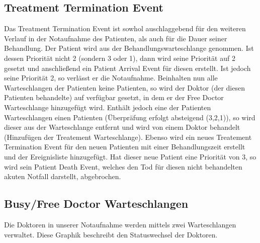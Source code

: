 \documentclass[12pt,fleqn,a4paper]{article}
\begin{document}
\subsection{Treatment Termination Event}
Das Treatment Termination Event ist sowhol auschlaggebend f\"{u}r den weiteren Verlauf in der Notaufnahme des Patienten, als auch f\"{u}r die Dauer seiner Behandlung. Der Patient wird aus der Behandlungswarteschlange genommen. Ist dessen Priorit\"{a}t nicht 2 (sondern 3 oder 1), dann wird seine Priorit\"{a}t auf 2 gesetzt und anschlie\ss end ein Patient Arrival Event f\"{u}r diesen erstellt. Ist jedoch seine Priorit\"{a}t 2, so verl\"{a}sst er die Notaufnahme.
Beinhalten nun alle Warteschlangen der Patienten keine Patienten, so wird der Doktor (der diesen Patienten behandelte) auf verf\"{u}gbar gesetzt, in dem er der Free Doctor Warteschlange hinzugef\"{u}gt wird. Enth\"{a}lt jedoch eine der Patienten Warteschlangen einen Patienten (\"{U}berpr\"{a}fung erfolgt absteigend (3,2,1)),  so wird dieser aus der Warteschlange entfernt und wird von einem Doktor behandelt (Hinzuf\"{u}gen der Treatement Warteschlange). Ebenso wird ein neues Treatement Termination Event f\"{u}r den neuen Patienten mit einer Behandlungszeit erstellt und der Ereignisliste hinzugef\"{u}gt.
Hat dieser neue Patient eine Priorit\"{a}t von 3, so wird sein Patient Death Event, welches den Tod f\"{u}r diesen nicht behandelten akuten Notfall darstellt, abgebrochen.
\begin{center}
\end{center}



\subsection{Busy/Free Doctor Warteschlangen}
Die Doktoren in unserer Notaufnahme werden mittels zwei Warteschlangen verwaltet. Diese Graphik beschreibt den Statuswechsel der Doktoren.
\begin{center}
\end{center}


\newpage
\end{document}
